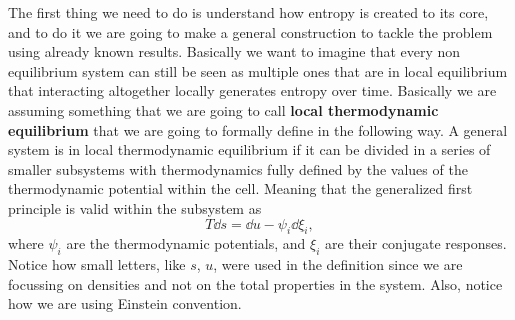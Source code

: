 The first thing we need to do is understand how entropy is created to its core, and to do it we are going to make a general construction to tackle the problem using already known results. Basically we want to imagine that every non equilibrium system can still be seen as multiple ones that are in local equilibrium that interacting altogether locally generates entropy over time. Basically we are assuming something that we are going to call \textbf{local thermodynamic equilibrium} that we are going to formally define in the following way.
{
    A general system is in local thermodynamic equilibrium if it can be divided in a series of smaller subsystems with thermodynamics fully defined by the values of the thermodynamic potential within the cell. Meaning that the generalized first principle is valid within the subsystem as
    \begin{equation}
        \label{eq:LocTheEqui}
        T\dd s = \dd u - \psi_i\dd \xi_i,
    \end{equation}
    where $\psi_i$ are the thermodynamic potentials, and $\xi_i$ are their conjugate responses.
}
\noindent
Notice how small letters, like $s$, $u$, were used in the definition since we are focussing on densities and not on the total properties in the system. Also, notice how we are using Einstein convention.


